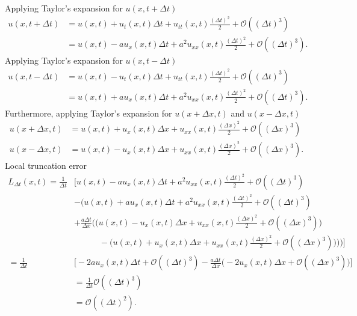 \documentclass[12pt]{article}
\begin{document}
Applying Taylor's expansion for $u(x,t+\Delta t)$
\begin{align*}
	u(x, t + \Delta t)
	 & = u(x,t) + u_t(x,t)\Delta t + u_{tt}(x,t) \frac{(\Delta t)^2}{2} + \mathcal{O}((\Delta t)^3)      \\
	 & = u(x,t) -au_x(x,t)\Delta t + a^2 u_{xx}(x,t) \frac{(\Delta t)^2}{2} + \mathcal{O}((\Delta t)^3).
\end{align*}
Applying Taylor's expansion for $u(x,t-\Delta t)$
\begin{align*}
	u(x, t - \Delta t)
	 & = u(x,t) - u_t(x,t)\Delta t + u_{tt}(x,t) \frac{(\Delta t)^2}{2} + \mathcal{O}((\Delta t)^3)       \\
	 & = u(x,t) + au_x(x,t)\Delta t + a^2 u_{xx}(x,t) \frac{(\Delta t)^2}{2} + \mathcal{O}((\Delta t)^3).
\end{align*}
Furthermore, applying Taylor's expansion for $u(x+\Delta x,t)$ and $u(x-\Delta x,t)$
\begin{align*}
	u(x+\Delta x,t)
	 & = u(x,t) + u_x(x,t)\Delta x + u_{xx}(x,t) \frac{(\Delta x)^2}{2} + \mathcal{O}((\Delta x)^3)  \\
	u(x-\Delta x,t)
	 & = u(x,t) - u_x(x,t)\Delta x + u_{xx}(x,t) \frac{(\Delta x)^2}{2} + \mathcal{O}((\Delta x)^3).
\end{align*}
Local truncation error 
\begin{align*}
	L_{\Delta t} (x,t) = \frac{1}{\Delta t} & \Big[ u(x,t) -au_x(x,t)\Delta t + a^2 u_{xx}(x,t) \frac{(\Delta t)^2}{2} + \mathcal{O}((\Delta t)^3)                                                  \\ &- \Big( u(x,t) + au_x(x,t)\Delta t + a^2 u_{xx}(x,t) \frac{(\Delta t)^2}{2} + \mathcal{O}((\Delta t)^3)\\
	                                        & + \frac{a \Delta t}{\Delta x} \Big( \Big(  u(x,t) - u_x(x,t)\Delta x + u_{xx}(x,t) \frac{(\Delta x)^2}{2} + \mathcal{O}((\Delta x)^3) \Big)           \\
	                                        & \qquad\quad - \Big( u(x,t) + u_x(x,t)\Delta x + u_{xx}(x,t) \frac{(\Delta x)^2}{2} + \mathcal{O}((\Delta x)^3) \Big) \Big) \Big) \Big]                \\
	= \frac{1}{\Delta t}                    & \Big[ -2au_x(x,t)\Delta t + \mathcal{O}((\Delta t)^3) - \frac{a \Delta t}{\Delta x} \Big( - 2u_x(x,t)\Delta x + \mathcal{O}((\Delta x)^3) \Big) \Big] \\
	                                        & = \frac{1}{\Delta t} \mathcal{O}((\Delta t)^3)                                                                                                        \\
	                                        & = \mathcal{O}((\Delta t)^2).
\end{align*}
\end{document}
